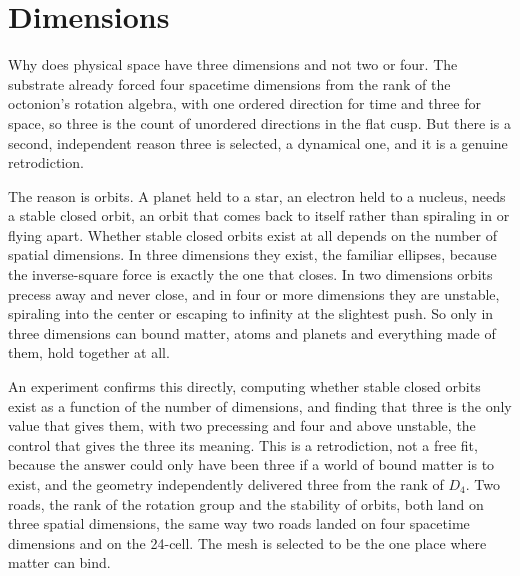 \section{Dimensions}

Why does physical space have three dimensions and not two or four. The substrate already forced four spacetime
dimensions from the rank of the octonion's rotation algebra, with one ordered direction for time and three for space, so
three is the count of unordered directions in the flat cusp. But there is a second, independent reason three is
selected, a dynamical one, and it is a genuine retrodiction.

The reason is orbits. A planet held to a star, an electron held to a nucleus, needs a stable closed orbit, an orbit that
comes back to itself rather than spiraling in or flying apart. Whether stable closed orbits exist at all depends on the
number of spatial dimensions. In three dimensions they exist, the familiar ellipses, because the inverse-square force is
exactly the one that closes. In two dimensions orbits precess away and never close, and in four or more dimensions they
are unstable, spiraling into the center or escaping to infinity at the slightest push. So only in three dimensions can
bound matter, atoms and planets and everything made of them, hold together at all.

An experiment confirms this directly, computing whether stable closed orbits exist as a function of the number of
dimensions, and finding that three is the only value that gives them, with two precessing and four and above unstable,
the control that gives the three its meaning. This is a retrodiction, not a free fit, because the answer could only have
been three if a world of bound matter is to exist, and the geometry independently delivered three from the rank of
$D_4$. Two roads, the rank of the rotation group and the stability of orbits, both land on three spatial dimensions, the
same way two roads landed on four spacetime dimensions and on the 24-cell. The mesh is selected to be the one place
where matter can bind.
